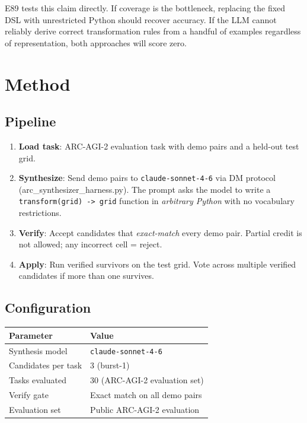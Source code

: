 \documentclass[11pt]{article}
\begin{document}
E89 tests this claim directly.  If coverage is the bottleneck, replacing the
fixed DSL with unrestricted Python should recover accuracy.  If the LLM
cannot reliably derive correct transformation rules from a handful of
examples regardless of representation, both approaches will score zero.

\section{Method}
\label{sec:method}

\subsection{Pipeline}

\begin{enumerate}
  \item \textbf{Load task}: ARC-AGI-2 evaluation task with demo pairs and a held-out test grid.
  \item \textbf{Synthesize}: Send demo pairs to \texttt{claude-sonnet-4-6} via DM protocol
        (arc\_synthesizer\_harness.py).  The prompt asks the model to write a
        \texttt{transform(grid) -> grid} function in \emph{arbitrary Python}
        with no vocabulary restrictions.
  \item \textbf{Verify}: Accept candidates that \emph{exact-match} every demo pair.
        Partial credit is not allowed; any incorrect cell = reject.
  \item \textbf{Apply}: Run verified survivors on the test grid.
        Vote across multiple verified candidates if more than one survives.
\end{enumerate}

\subsection{Configuration}

\begin{center}
\begin{tabular}{ll}
\toprule
Parameter & Value \\
\midrule
Synthesis model & \texttt{claude-sonnet-4-6} \\
Candidates per task & 3 (burst-1) \\
Tasks evaluated & 30 (ARC-AGI-2 evaluation set) \\
Verify gate & Exact match on all demo pairs \\
Evaluation set & Public ARC-AGI-2 evaluation \\
\bottomrule
\end{tabular}
\end{center}
\end{document}
